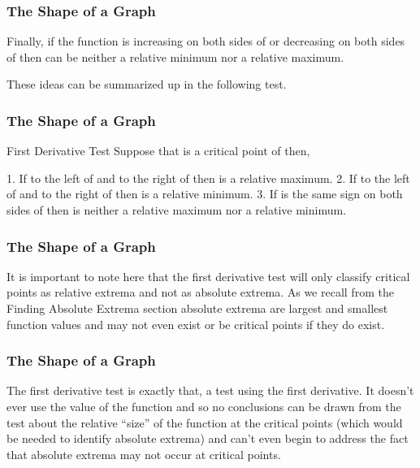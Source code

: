 \documentclass{beamer}
\begin{document}
\begin{frame} 
	\frametitle{The Shape of a Graph} Finally, if the function is increasing on both sides of  or decreasing on both sides of  then  can be neither a relative minimum nor a relative maximum.

These ideas can be summarized up in the following test.
\end{frame}
\begin{frame} 
	\frametitle{The Shape of a Graph}
First Derivative Test
Suppose that  is a critical point of  then,

1.      If   to the left of  and  to the right of  then  is a relative maximum.
2.      If   to the left of  and  to the right of  then  is a relative minimum.
3.      If   is the same sign on both sides of  then  is neither a relative maximum nor a relative minimum.

\end{frame}
\begin{frame} 
	\frametitle{The Shape of a Graph}
It is important to note here that the first derivative test will only classify critical points as relative extrema and not as absolute extrema.  As we recall from the Finding Absolute Extrema section absolute extrema are largest and smallest function values and may not even exist or be critical points if they do exist. 
\end{frame}
\begin{frame} 
	\frametitle{The Shape of a Graph}
The first derivative test is exactly that, a test using the first derivative.  It doesn’t ever use the value of the function and so no conclusions can be drawn from the test about the relative “size” of the function at the critical points (which would be needed to identify absolute extrema) and can’t even begin to address the fact that absolute extrema may not occur at critical points.
\end{frame}
\end{document}
